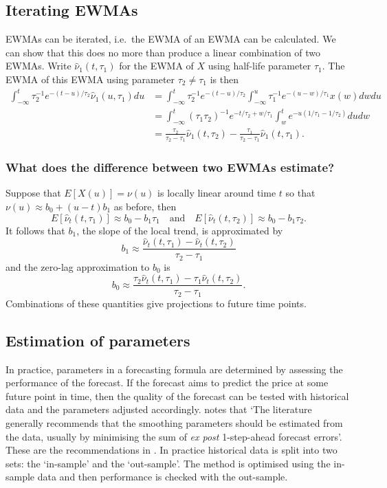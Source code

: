 \subsection{Iterating EWMAs}
EWMAs can be iterated, i.e.\ the EWMA of an EWMA can be calculated. We can show that this does no more than produce a linear combination of two EWMAs. Write $\hat{\nu}_1(t,\tau_1)$ for the EWMA of $X$ using half-life parameter $\tau_1$. The EWMA of this EWMA using parameter $\tau_2 \neq \tau_1$ is then
\begin{align*}
\int_{-\infty}^t \tau_2^{-1} e^{-(t-u)/\tau_2}\hat{\nu}_1(u,\tau_1) du 
&= \int_{-\infty}^t \tau_2^{-1} e^{-(t-u)/\tau_2}\int_{-\infty}^u \tau_1^{-1} e^{-(u-w)/\tau_1}x(w) dw du \\
&= \int_{-\infty}^t (\tau_1 \tau_2)^{-1}e^{-t/\tau_2 + w/\tau_1}\int_{w}^t e^{-u(1/\tau_1 - 1/\tau_2)} du dw \\
&= \frac{\tau_2}{\tau_2-\tau_1} \hat{\nu}_1(t,\tau_2) - \frac{\tau_1}{\tau_2-\tau_1} \hat{\nu}_1(t,\tau_1).
\end{align*}

\subsubsection*{What does the difference between two EWMAs estimate?}
Suppose that $E[X(u)] = \nu(u)$ is locally linear around time $t$ so that $\nu(u) \approx b_0 + (u-t)b_1$ as before, then
$$E[\hat{\nu}_t(t,\tau_1)] \approx b_0 - b_1 \tau_1 \quad \text{and} \quad E[\hat{\nu}_t(t,\tau_2)] \approx b_0 - b_1 \tau_2.$$
It follows that $b_1$, the slope of the local trend, is approximated by
$$ b_1 \approx \frac{\hat{\nu}_t(t,\tau_1) - \hat{\nu}_t(t,\tau_2)}{\tau_2-\tau_1}$$
and the zero-lag approximation to $b_0$ is
$$ b_0 \approx \frac{\tau_2 \hat{\nu}_t(t,\tau_1) - \tau_1 \hat{\nu}_t(t,\tau_2)}{\tau_2-\tau_1}.$$
Combinations of these quantities give projections to future time points.
\subsection{Estimation of parameters}
In practice, parameters in a forecasting formula are determined by assessing the performance of the forecast. If the forecast aims to predict the price at some future point in time, then the quality of the forecast can be tested with historical data and the parameters adjusted accordingly. \citet{taylor2004smooth} notes that `The
literature generally recommends that the smoothing parameters should be estimated from the
data, usually by minimising the sum of \emph{ex post} 1-step-ahead forecast errors'. These are the recommendations in \citet{gardner2006exponential}. In practice historical data is split into two sets: the `in-sample' and the `out-sample'.  The method is optimised using the in-sample data and then performance is checked with the out-sample.  

